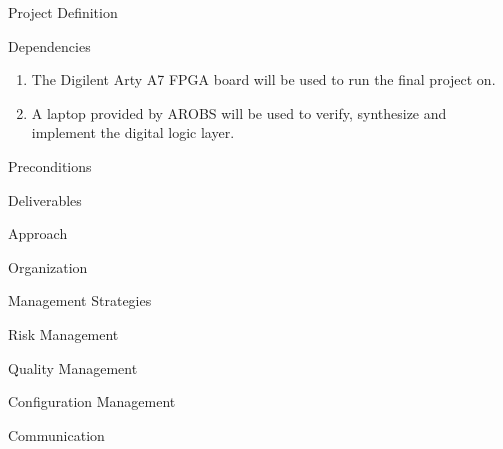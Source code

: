 \documentclass{matthijs}
\begin{document}
\begin{hoofdstuk}{Project Definition}
\begin{paragraaf}{Dependencies}
			\begin{enumerate}

				\item The Digilent Arty A7 FPGA board will be used to run the final project on.
				\item A laptop provided by AROBS will be used to verify, synthesize and implement the digital logic layer.
		
			\end{enumerate}

		\end{paragraaf}

		\begin{paragraaf}{Preconditions}

		\end{paragraaf}

	\end{hoofdstuk}

	\begin{hoofdstuk}{Deliverables}

	\end{hoofdstuk}

	\begin{hoofdstuk}{Approach}

	\end{hoofdstuk}

	\begin{hoofdstuk}{Organization}

	\end{hoofdstuk}

	\begin{hoofdstuk}{Management Strategies}

		\begin{paragraaf}{Risk Management}

		\end{paragraaf}
		
		\begin{paragraaf}{Quality Management}

		\end{paragraaf}

		\begin{paragraaf}{Configuration Management}

		\end{paragraaf}

		\begin{paragraaf}{Communication}

		\end{paragraaf}

	\end{hoofdstuk}
\end{document}
